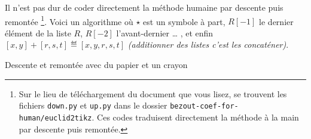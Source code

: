 Il n'est pas dur de coder directement la méthode humaine par descente puis remontée
\footnote{
	Sur le lieu de téléchargement du document que vous lisez, se trouvent les fichiers \texttt{down.py} et \texttt{up.py} dans le dossier \texttt{bezout-coef-for-human/euclid2tikz}.
	Ces codes traduisent directement la méthode à la main par descente puis remontée.
}.
Voici un algorithme où $\star$ est un symbole à part, $R[-1]$ le dernier élément de la liste $R$, $R[-2]$ l'avant-dernier \dots{} , et enfin $[x, y] + [r, s, t] \eqdef [x, y, r, s, t]$ \emph{(additionner des listes c'est les concaténer)}.


\begin{algo}
	\caption{Descente et remontée avec du papier et un crayon} \label{algo-human-paper}
	\addalgoblank
\end{algo}


